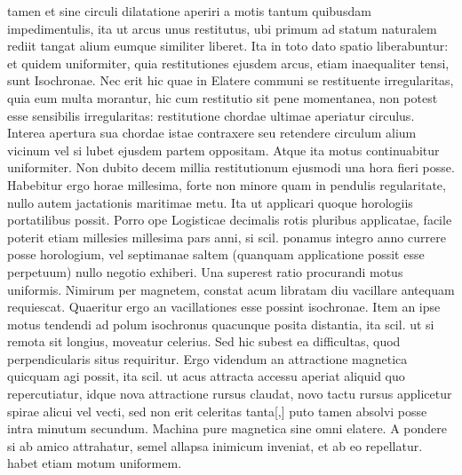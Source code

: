  tamen et sine circuli dilatatione aperiri a motis  tantum quibusdam impedimentulis, ita ut arcus unus restitutus, ubi primum ad statum naturalem\protect{} rediit tangat  alium eumque similiter liberet. Ita in toto dato spatio  liberabuntur: et quidem uniformiter, quia restitutiones ejusdem arcus, etiam inaequaliter tensi, sunt Isochronae. Nec erit hic quae in Elatere\protect{} communi se restituente irregularitas, quia eum multa morantur, hic  cum restitutio sit pene momentanea, non potest esse  sensibilis irregularitas: restitutione chordae ultimae aperiatur circulus. Interea apertura sua chordae istae contraxere seu retendere circulum alium vicinum vel si  lubet ejusdem partem oppositam. Atque ita motus continuabitur uniformiter. Non dubito decem millia  restitutionum ejus\-modi una hora fieri posse. Habebitur  ergo horae  millesima, forte non minore  quam in pendulis\protect{} regularitate, nullo autem jactationis maritimae metu. Ita ut applicari quoque horologiis portatilibus\protect{} possit. Porro ope Logisticae decimalis rotis pluribus applicatae, facile poterit etiam millesies millesima pars anni, si scil. ponamus integro anno currere posse horologium\protect{}, vel septimanae  saltem (quanquam applicatione possit esse perpetuum)  nullo negotio exhiberi. Una superest ratio procurandi motus uniformis\protect{}. Nimirum per magnetem\protect{}, constat acum  libratam diu vacillare antequam requiescat. Quaeritur ergo an vacillationes esse possint isochronae. Item an ipse motus tendendi ad polum isochronus quacunque posita distantia, ita scil.  ut si remota sit longius, moveatur celerius. Sed hic subest  ea difficultas, quod perpendicularis situs requiritur. Ergo  videndum an attractione magnetica\protect{} quicquam agi possit, ita  scil. ut acus attracta accessu aperiat aliquid quo repercutiatur, idque nova attractione\protect{} rursus claudat, novo tactu rursus  applicetur spirae\protect{} alicui vel vecti, sed non erit celeritas\protect{} tanta[,]  puto tamen absolvi posse intra minutum secundum. Machina pure magnetica sine omni elatere. A pondere si ab amico attrahatur, semel allapsa inimicum inveniat, et  ab eo repellatur. %
{} habet etiam motum uniformem\protect{}.\pend
 


